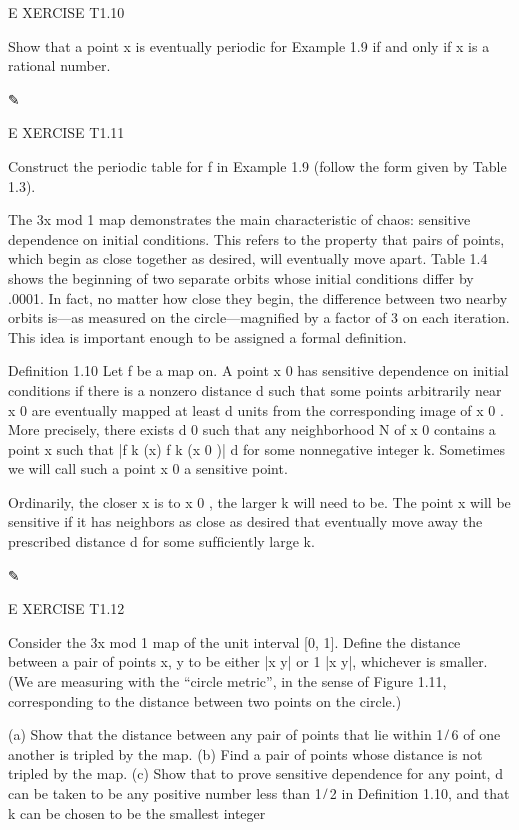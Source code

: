 E XERCISE T1.10

Show that a point x is eventually periodic for Example 1.9 if and only if x is a rational number.

✎

E XERCISE T1.11

Construct the periodic table for f in Example 1.9 (follow the form given by Table 1.3).

The 3x mod 1 map demonstrates the main characteristic of chaos: sensitive dependence on initial 
conditions. This refers to the property that pairs of points, which begin as close together as desired, 
will eventually move apart. Table 1.4 shows the beginning of two separate orbits whose initial conditions 
differ by .0001. In fact, no matter how close they begin, the difference between two nearby orbits is—as 
measured on the circle—magniﬁed by a factor of 3 on each iteration. This idea is important enough to be 
assigned a formal deﬁnition.

Deﬁnition 1.10 Let f be a map on. A point x 0 has sensitive dependence on initial conditions if there is a 
nonzero distance d such that some points arbitrarily near x 0 are eventually mapped at least d units from 
the corresponding image of x 0 . More precisely, there exists d   0 such that any neighborhood N of x 0 
contains a point x such that |f k (x)  f k (x 0 )| 
 d for some nonnegative integer k. Sometimes we will call such a point x 0 a sensitive point.

Ordinarily, the closer x is to x 0 , the larger k will need to be. The point x will be sensitive if it has 
neighbors as close as desired that eventually move away the prescribed distance d for some sufﬁciently 
large k.

✎

E XERCISE T1.12

Consider the 3x mod 1 map of the unit interval [0, 1]. Deﬁne the distance between a pair of points x, y to 
be either |x  y| or 1  |x  y|, whichever is smaller. (We are measuring with the “circle metric”, in the 
sense of Figure 1.11, corresponding to the distance between two points on the circle.)

(a) Show that the distance between any pair of points that lie within 1 ̸ 6 of one another is tripled by the 
map. (b) Find a pair of points whose distance is not tripled by the map. (c) Show that to prove sensitive 
dependence for any point, d can be taken to be any positive number less than 1 ̸ 2 in Deﬁnition 1.10, and 
that k can be chosen to be the smallest integer

